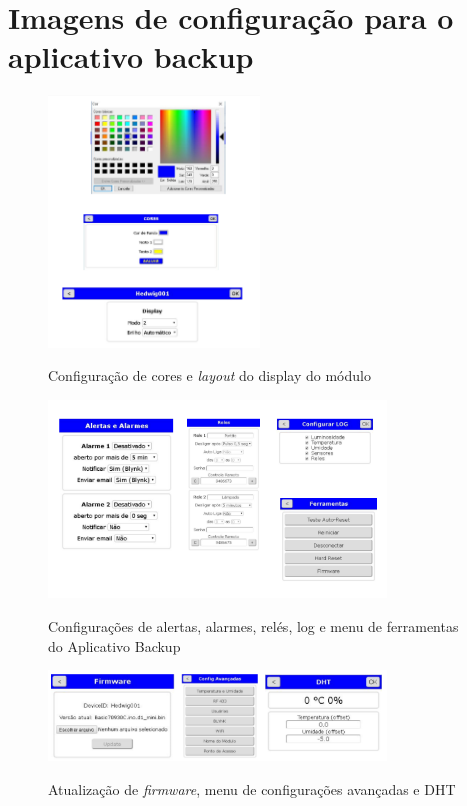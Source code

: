 \chapter{Imagens de configuração para o aplicativo backup}
\label{attachmentsImagensBackup}

\begin{figure}[H]
	\centering
	\caption{Configuração de cores e \textit{layout} do display do módulo}
	\includegraphics[width=0.5\textwidth]{configCoresLayoutAppBackup}
	\label{fig:configCoresLayoutAppBackups}
\end{figure}

\begin{figure}[H]
	\centering
	\caption{Configurações de alertas, alarmes, relés, log e menu de ferramentas do Aplicativo Backup}
	\includegraphics[width=0.8\textwidth]{configalertasreleslogferramentas}
	\label{fig:configalertasreleslogferramentas}
\end{figure}

\begin{figure}[H]
	\centering
	\caption{Atualização de \emph{firmware}, menu de configurações avançadas e DHT}
	\includegraphics[width=0.8\textwidth]{firmwareconfigavancadasDHT}
	\label{fig:firmwareconfigavancadasDHT}
\end{figure}


